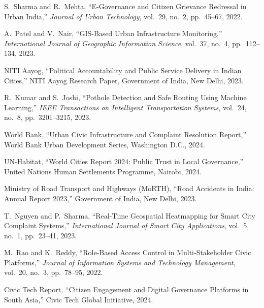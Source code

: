 \documentclass[12pt,a4paper]{report}
\begin{document}
\begin{enumerate}[label={[\arabic*]}, leftmargin=2.5em, itemsep=6pt]

\item S.~Sharma and R.~Mehta, ``E-Governance and Citizen Grievance
Redressal in Urban India,'' \textit{Journal of Urban Technology},
vol.~29, no.~2, pp.~45--67, 2022.

\item A.~Patel and V.~Nair, ``GIS-Based Urban Infrastructure Monitoring,''
\textit{International Journal of Geographic Information Science},
vol.~37, no.~4, pp.~112--134, 2023.

\item NITI Aayog, ``Political Accountability and Public Service Delivery
in Indian Cities,'' NITI Aayog Research Paper, Government of India,
New Delhi, 2023.

\item R.~Kumar and S.~Joshi, ``Pothole Detection and Safe Routing Using
Machine Learning,'' \textit{IEEE Transactions on Intelligent
Transportation Systems}, vol.~24, no.~8, pp.~3201--3215, 2023.

\item World Bank, ``Urban Civic Infrastructure and Complaint Resolution
Report,'' World Bank Urban Development Series, Washington D.C., 2024.

\item UN-Habitat, ``World Cities Report 2024: Public Trust in Local
Governance,'' United Nations Human Settlements Programme, Nairobi, 2024.

\item Ministry of Road Transport and Highways (MoRTH), ``Road Accidents
in India: Annual Report 2023,'' Government of India, New Delhi, 2023.

\item T.~Nguyen and P.~Sharma, ``Real-Time Geospatial Heatmapping for
Smart City Complaint Systems,'' \textit{International Journal of Smart
City Applications}, vol.~5, no.~1, pp.~23--41, 2023.

\item M.~Rao and K.~Reddy, ``Role-Based Access Control in
Multi-Stakeholder Civic Platforms,'' \textit{Journal of Information
Systems and Technology Management}, vol.~20, no.~3, pp.~78--95, 2022.

\item Civic Tech Report, ``Citizen Engagement and Digital Governance
Platforms in South Asia,'' Civic Tech Global Initiative, 2024.


\end{enumerate}
\end{document}
